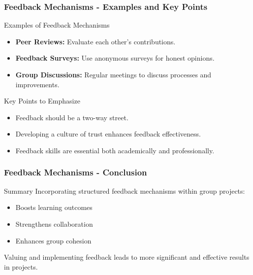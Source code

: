 \documentclass[aspectratio=169]{beamer}
\begin{document}
\begin{frame}[fragile]
    \frametitle{Feedback Mechanisms - Examples and Key Points}
    \begin{block}{Examples of Feedback Mechanisms}
        \begin{itemize}
            \item \textbf{Peer Reviews:} Evaluate each other's contributions.
            \item \textbf{Feedback Surveys:} Use anonymous surveys for honest opinions.
            \item \textbf{Group Discussions:} Regular meetings to discuss processes and improvements.
        \end{itemize}
    \end{block}

    \begin{block}{Key Points to Emphasize}
        \begin{itemize}
            \item Feedback should be a two-way street.
            \item Developing a culture of trust enhances feedback effectiveness.
            \item Feedback skills are essential both academically and professionally.
        \end{itemize}
    \end{block}
\end{frame}

\begin{frame}[fragile]
    \frametitle{Feedback Mechanisms - Conclusion}
    \begin{block}{Summary}
        Incorporating structured feedback mechanisms within group projects:
        \begin{itemize}
            \item Boosts learning outcomes
            \item Strengthens collaboration
            \item Enhances group cohesion
        \end{itemize}
        Valuing and implementing feedback leads to more significant and effective results in projects.
    \end{block}
\end{frame}
\end{document}
